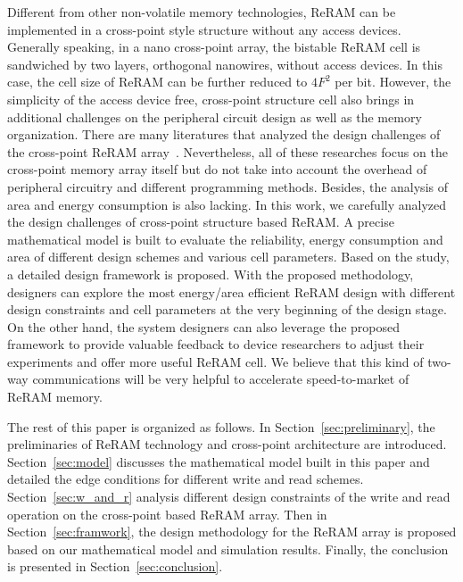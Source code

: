 Different from other non-volatile memory technologies, ReRAM can be implemented in a cross-point style structure without any access devices. Generally speaking, in a nano cross-point array, the bistable ReRAM cell is sandwiched by two layers, orthogonal nanowires, without access devices. In this case, the cell size of ReRAM can be further reduced to $4F^2$ per bit. However, the simplicity of the access device free, cross-point structure cell also brings in additional challenges on the peripheral circuit design as well as the memory organization. There are many literatures that analyzed the design challenges of the cross-point ReRAM array~\cite{crossbar_NANO08_Flocke,crossbar_NANO2002_Ziegler,crossbar_NANO2003_Ziegler,crossbar_TED_2010}. Nevertheless, all of these researches focus on the cross-point memory array itself but do not take into account the overhead of peripheral circuitry and different programming methods. Besides, the analysis of area and energy consumption is also lacking. In this work, we carefully analyzed the design challenges of cross-point structure based ReRAM. A precise mathematical model is built to evaluate the reliability, energy consumption and area of different design schemes and various cell parameters. Based on the study, a detailed design framework is proposed. With the proposed methodology, designers can explore the most energy/area efficient ReRAM design with different design constraints and cell parameters at the very beginning of the design stage. On the other hand, the system designers can also leverage the proposed framework to provide valuable feedback to device researchers to adjust their experiments and offer more useful ReRAM cell. We believe that this kind of two-way communications will be very helpful to accelerate speed-to-market of ReRAM memory.

The rest of this paper is organized as follows. In
Section~\ref{sec:preliminary}, the preliminaries of ReRAM technology and cross-point architecture are introduced. Section~\ref{sec:model} discusses the mathematical model built in this paper and detailed the edge conditions for different write and read schemes. Section~\ref{sec:w_and_r} analysis different design constraints of the write and read operation on the cross-point based ReRAM array. Then in Section~\ref{sec:framwork}, the design methodology for the ReRAM array is proposed based on our mathematical model and simulation results. Finally, the conclusion is presented in Section~\ref{sec:conclusion}. 